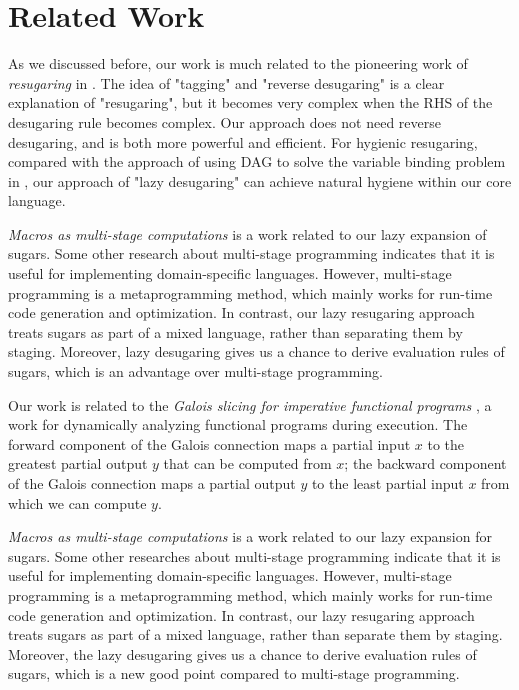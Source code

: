\section{Related Work}
\label{sec6}

As we discussed before, our work is much related to the pioneering work of \emph{resugaring} in \cite{resugaring}. The idea of "tagging" and "reverse desugaring" is a clear explanation of "resugaring", but it becomes very complex when the RHS of the desugaring rule becomes complex. Our approach does not need reverse desugaring, and is both more powerful and efficient.
For hygienic resugaring, compared with the approach of using DAG to solve the variable binding problem in \cite{hygienic}, our approach of "lazy desugaring" can achieve natural hygiene within our core language.

\emph{Macros as multi-stage computations} \cite{multistage} is a work related to our lazy expansion of sugars. Some other research \cite{modularstaging} about multi-stage programming \cite{MSP} indicates that it is useful for implementing domain-specific languages. However, multi-stage programming is a metaprogramming method, which mainly works for run-time code generation and optimization. In contrast, our lazy resugaring approach treats sugars as part of a mixed language, rather than separating them by staging. Moreover, lazy desugaring gives us a chance to derive evaluation rules of sugars, which is an advantage over multi-stage programming.

Our work is related to the \emph{Galois slicing for imperative functional programs} \cite{slicing}, a work for dynamically analyzing functional programs during execution. The forward component of the Galois connection maps a partial input $x$ to the greatest partial output $y$ that can be computed from $x$; the backward component of the Galois connection maps a partial output $y$ to the least partial input $x$ from which we can compute $y$.


\emph{Macros as multi-stage computations} \cite{multistage} is a work related to our lazy expansion for sugars. Some other researches \cite{modularstaging} about multi-stage programming \cite{MSP} indicate that it is useful for implementing domain-specific languages. However, multi-stage programming is a metaprogramming method, which mainly works for run-time code generation and optimization. In contrast, our lazy resugaring approach treats sugars as part of a mixed language, rather than separate them by staging. Moreover, the lazy desugaring gives us a chance to derive evaluation rules of sugars, which is a new good point compared to multi-stage programming.

